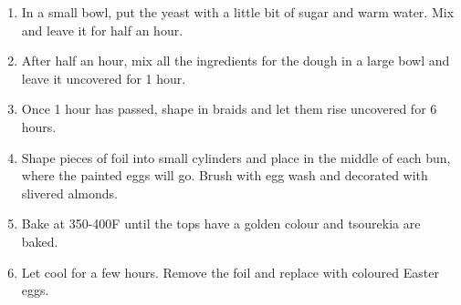 \begin{enumerate}
    \item In a small bowl, put the yeast with a little bit of sugar and warm water. Mix and leave it for half an hour.
    \item After half an hour, mix all the ingredients for the dough in a large bowl and leave it uncovered for 1 hour.
    \item Once 1 hour has passed, shape in braids and let them rise uncovered for 6 hours.
    \item Shape pieces of foil into small cylinders and place in the middle of each bun, where the painted eggs will go. Brush with egg wash and decorated with slivered almonds.
    \item Bake at 350-400\degree F until the tops have a golden colour and tsourekia are baked.
    \item Let cool for a few hours. Remove the foil and replace with coloured Easter eggs.
\end{enumerate}

